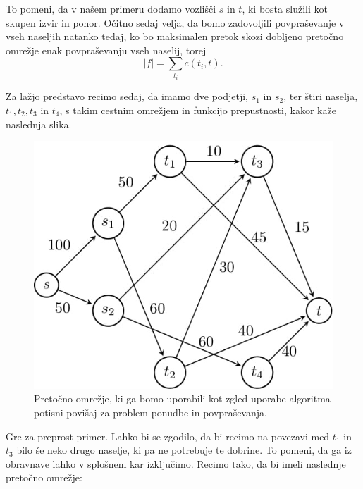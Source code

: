 \documentclass[mat1]{fmfdelo}
\begin{document}
To pomeni, da v našem primeru dodamo vozlišči $s$ in $t$, ki bosta služili kot skupen izvir in ponor. Očitno sedaj velja, da bomo zadovoljili povpraševanje v vseh naseljih natanko tedaj, ko bo
maksimalen pretok skozi dobljeno pretočno omrežje enak povpraševanju vseh naselij, torej \[ |f| = \sum_{t_i} c(t_i, t). \]

Za lažjo predstavo recimo sedaj, da imamo dve podjetji, $s_1$ in $s_2$, ter štiri nase\-lja, $t_1, t_2, t_3$ in $t_4$, s takim cestnim omrežjem in funkcijo prepustnosti, kakor kaže
naslednja slika.

\begin{figure}[H]
  \centering
  \includegraphics[scale=.358]{images/primer1-1/primer1-1-1.jpg}
  \caption{Pretočno omrežje, ki ga bomo uporabili kot zgled uporabe algoritma potisni-povišaj za problem ponudbe in povpraševanja.}
\end{figure}

Gre za preprost primer. Lahko bi se zgodilo, da bi recimo na povezavi med $t_1$ in $t_3$ bilo še neko drugo naselje, ki pa ne potrebuje te dobrine. To pomeni,
da ga iz obravnave lahko v splošnem kar izključimo. Recimo tako, da bi imeli naslednje pretočno omrežje:
\end{document}
